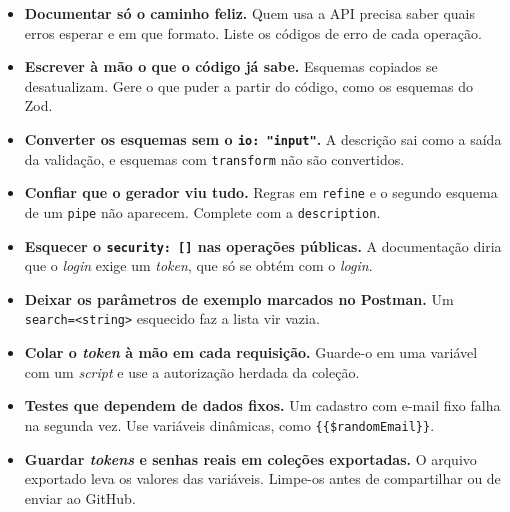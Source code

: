\begin{itemize}
  \item \textbf{Documentar só o caminho feliz.} Quem usa a API precisa saber quais erros esperar e em que formato. Liste os códigos de erro de cada operação.
  \item \textbf{Escrever à mão o que o código já sabe.} Esquemas copiados se desatualizam. Gere o que puder a partir do código, como os esquemas do Zod.
  \item \textbf{Converter os esquemas sem o \texttt{io: "input"}.} A descrição sai como a saída da validação, e esquemas com \texttt{transform} não são convertidos.
  \item \textbf{Confiar que o gerador viu tudo.} Regras em \texttt{refine} e o segundo esquema de um \texttt{pipe} não aparecem. Complete com a \texttt{description}.
  \item \textbf{Esquecer o \texttt{security: []} nas operações públicas.} A documentação diria que o \textit{login} exige um \textit{token}, que só se obtém com o \textit{login}.
  \item \textbf{Deixar os parâmetros de exemplo marcados no Postman.} Um \texttt{search=<string>} esquecido faz a lista vir vazia.
  \item \textbf{Colar o \textit{token} à mão em cada requisição.} Guarde-o em uma variável com um \textit{script} e use a autorização herdada da coleção.
  \item \textbf{Testes que dependem de dados fixos.} Um cadastro com e-mail fixo falha na segunda vez. Use variáveis dinâmicas, como \texttt{\{\{\$randomEmail\}\}}.
  \item \textbf{Guardar \textit{tokens} e senhas reais em coleções exportadas.} O arquivo exportado leva os valores das variáveis. Limpe-os antes de compartilhar ou de enviar ao GitHub.
\end{itemize}
